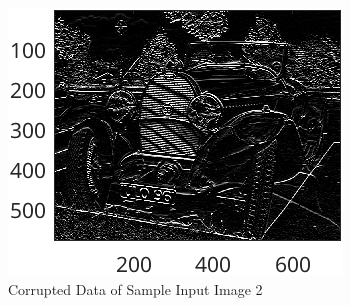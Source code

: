 \documentclass{article}
\begin{document}
\begin{itemize}
\begin{figure}[ht]
\begin{minipage}[t]{0.45\textwidth}
    			\includegraphics[width=\textwidth]{2AE2Corrupted_sobel}
    			\caption{Corrupted Data of Sample Input Image 2}
    			\label{fig:sobel_cd}
  			\end{minipage}
			\end{figure}


\end{itemize}
\end{document}
